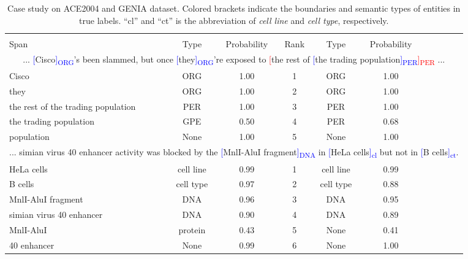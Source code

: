 \documentclass[11pt]{article}
\begin{document}
\begin{table*}[ht]
\small
\centering
\begin{tabular}{p{6cm}ccccccccc}
\toprule
&&  & & &  \\
Span & Type & Probability& Rank & Type & Probability &&&&\\
\midrule
\multicolumn{10}{c}{... \textcolor{blue}{[}Cisco\textcolor{blue}{]\textsubscript{ORG}}'s been slammed, but once \textcolor{blue}{[}they\textcolor{blue}{]\textsubscript{ORG}}'re exposed to \textcolor{red}{[}the rest of \textcolor{blue}{[}the trading population\textcolor{blue}{]\textsubscript{PER}}\textcolor{red}{]\textsubscript{PER}} ...}\\
\midrule
Cisco & ORG &1.00 &1& ORG & 1.00 \\
they & ORG &1.00&2& ORG & 1.00 \\
the rest of the trading population & PER &1.00 &3& PER & 1.00 \\
the trading population & GPE & 0.50 &4& PER & 0.68 \\
population & None  & 1.00 &5& None  & 1.00 \\
\midrule
\multicolumn{10}{c}{... simian virus 40 enhancer activity was blocked by the \textcolor{blue}{[}MnlI-AluI fragment\textcolor{blue}{]\textsubscript{DNA}} in \textcolor{blue}{[}HeLa cells\textcolor{blue}{]\textsubscript{cl}} but not in \textcolor{blue}{[}B cells\textcolor{blue}{]\textsubscript{ct}}.}\\
\midrule
HeLa cells & cell line & 0.99 &1& cell line & 0.99 \\
B cells & cell type & 0.97 &2& cell type & 0.88 \\
MnlI-AluI fragment & DNA & 0.96 &3& DNA & 0.95 \\
simian virus 40 enhancer & DNA & 0.90 &4& DNA & 0.89  \\
MnlI-AluI & protein & 0.43 &5& None & 0.41 \\
40 enhancer & None & 0.99 &6& None & 1.00 \\
\bottomrule
\end{tabular}
\centering
\caption{Case study on ACE2004 and GENIA dataset.
Colored brackets indicate the boundaries and semantic types of entities in true labels. ``cl'' and ``ct'' is the abbreviation of \textit{cell line} and \textit{cell type}, respectively. }
\label{table:ex2}
\end{table*}
\end{document}
